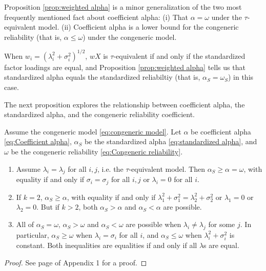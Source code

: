 \documentclass[twoside]{article}
\renewcommand{\sqrt}[1]{{(#1)^{1/2}}}
\begin{document}

Proposition \ref{prop:weighted alpha} is a minor generalization of the two most frequently mentioned fact about coefficient alpha: (i) That $\alpha = \omega$ under the $\tau$-equivalent model. (ii) Coefficient alpha is a lower bound for the congeneric reliability (that is, $\alpha \leq \omega$) under the congeneric model.
 
When $w_{i}=\sqrt{\lambda_{i}^{2}+\sigma_{i}^{2}}$, $wX$ is $\tau$-equivalent if and only if the standardized factor loadings are equal, and Proposition \ref{prop:weighted alpha} tells us that standardized alpha equals the standardized reliabiltiy (that is, $\alpha_S = \omega_S$) in this case. 

The next proposition explores the relationship between coefficient alpha, the standardized alpha, and the congeneric reliability coefficient.

\begin{prop}
\label{prop:Reliabilities.}Assume the congeneric model \eqref{eq:congeneric model}. Let $\alpha$ be coefficient alpha \eqref{eq:Coefficient alpha}, $\alpha_S$ be the standardized alpha \eqref{eq:standardized alpha}, and  $\omega$ be the congeneric reliability \eqref{eq:Congeneric reliability}. 
\begin{enumerate}[label=(\roman*)]
\item Assume $\lambda_{i}=\lambda_{j}$ for all $i,j$, i.e. the $\tau$-equivalent model. Then $\alpha_S \geq \alpha = \omega$, with equality if and only if $\sigma_{i}=\sigma_{j}$ for all $i,j$ or $\lambda_i = 0$ for all $i$.
\item If $k=2$, $\alpha_S\geq\alpha$, with equality if and only if $\lambda_{1}^{2}+\sigma_{1}^{2}=\lambda_{2}^{2}+\sigma_{2}^{2}$ or $\lambda_1 = 0$ or $\lambda_2 = 0$. But if $k>2$, both $\alpha_S>\alpha$
and $\alpha_S<\alpha$ are possible.
\item All of $\alpha_S=\omega$, $\alpha_S>\omega$ and $\alpha_S<\omega$
are possible when $\lambda_{i}\neq\lambda_{j}$ for some $j$. In particular, $\alpha_S \geq \omega$ when $\lambda_i = \sigma_i$ for all $i$, and $\alpha_S \leq \omega$ when $\lambda_i^2 + \sigma_i^2$ is constant. Both inequalities are equalities if and only if all $\lambda$s are equal.
\end{enumerate}
\end{prop}
\begin{proof}
See page \pageref{proof:Reliabilities.} of Appendix 1 for a proof.
\end{proof}
\end{document}
